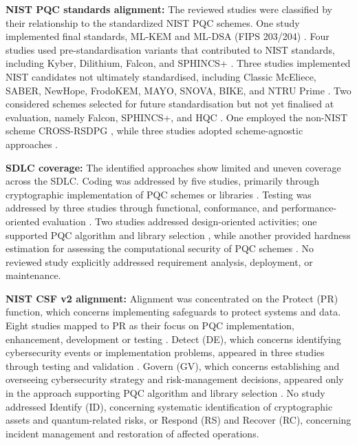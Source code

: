 \documentclass[letterpaper,twocolumn,10pt]{article}
\begin{document}
\textbf{NIST PQC standards alignment: } The reviewed studies were classified by their relationship to the standardized NIST PQC schemes. One study implemented final standards, ML-KEM and ML-DSA (FIPS 203/204) \cite{Ana_PQCLeo25}. Four studies used pre-standardisation variants that contributed to NIST standards, including Kyber, Dilithium, Falcon, and SPHINCS+ \cite{Ana_ojha2025adoption, Ana_tsili_scalable_2025, Ana_e27020212, Ana_hekkala_implementing_2023}. Three studies implemented NIST candidates not ultimately standardised, including Classic McEliece, SABER, NewHope, FrodoKEM, MAYO, SNOVA, BIKE, and NTRU Prime \cite{Ana_huelsing2021wireguard, Ana_saucedo-estrada_post-quantum_2020, Ana_PQCLeo25}. Two considered schemes selected for future standardisation but not yet finalised at evaluation, namely Falcon, SPHINCS+, and HQC \cite{Ana_tsili_scalable_2025, Ana_PQCLeo25}. One employed the non-NIST scheme CROSS-RSDPG \cite{Ana_PQCLeo25}, while three studies adopted scheme-agnostic approaches \cite{Ana_decisionAlgo, Ana_kannwischer_improving_2022, Ana_esser_sok_2024}.

\textbf{SDLC coverage: } The identified approaches show limited and uneven coverage across the SDLC. Coding was addressed by five studies, primarily through cryptographic implementation of PQC schemes or libraries \cite{Ana_huelsing2021wireguard, Ana_ojha2025adoption, Ana_tsili_scalable_2025, Ana_hekkala_implementing_2023, Ana_saucedo-estrada_post-quantum_2020}. Testing was addressed by three studies through functional, conformance, and performance-oriented evaluation \cite{Ana_kannwischer_improving_2022, Ana_e27020212, Ana_PQCLeo25}. Two studies addressed design-oriented activities; one supported PQC algorithm and library selection \cite{Ana_decisionAlgo}, while another provided hardness estimation for assessing the computational security of PQC schemes \cite{Ana_esser_sok_2024}. No reviewed study explicitly addressed requirement analysis, deployment, or maintenance. 

\textbf{NIST CSF v2 alignment: } Alignment was concentrated on the Protect (PR) function, which concerns implementing safeguards to protect systems and data. Eight studies mapped to PR as their focus on PQC implementation, enhancement, development or testing \cite{Ana_huelsing2021wireguard, Ana_ojha2025adoption, Ana_tsili_scalable_2025, Ana_esser_sok_2024, Ana_hekkala_implementing_2023, Ana_saucedo-estrada_post-quantum_2020, Ana_kannwischer_improving_2022, Ana_PQCLeo25}. Detect (DE), which concerns identifying cybersecurity events or implementation problems, appeared in three studies through testing and validation \cite{Ana_kannwischer_improving_2022, Ana_e27020212, Ana_PQCLeo25}. Govern (GV), which concerns establishing and overseeing cybersecurity strategy and risk-management decisions, appeared only in the approach supporting PQC algorithm and library selection \cite{Ana_decisionAlgo}. No study addressed Identify (ID), concerning systematic identification of cryptographic assets and quantum-related risks, or Respond (RS) and Recover (RC), concerning incident management and restoration of affected operations.
\end{document}
